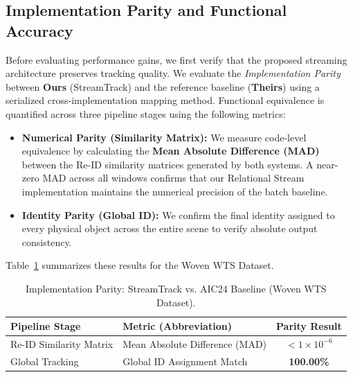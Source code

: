 \documentclass[11pt]{article}
\begin{document}
\subsection{Implementation Parity and Functional Accuracy}
Before evaluating performance gains, we first verify that the proposed streaming architecture preserves tracking quality. We evaluate the \emph{Implementation Parity} between \textbf{Ours} (StreamTrack) and the reference baseline (\textbf{Theirs}) using a serialized cross-implementation mapping method. Functional equivalence is quantified across three pipeline stages using the following metrics:

\begin{itemize}[leftmargin=*]
    \item \textbf{Numerical Parity (Similarity Matrix):} We measure code-level equivalence by calculating the \textbf{Mean Absolute Difference (MAD)} between the Re-ID similarity matrices generated by both systems. A near-zero MAD across all windows confirms that our Relational Stream implementation maintains the numerical precision of the batch baseline.
    \item \textbf{Identity Parity (Global ID):} We confirm the final identity assigned to every physical object across the entire scene to verify absolute output consistency.
\end{itemize}

Table~\ref{tab:parity_metrics} summarizes these results for the Woven WTS Dataset.

\begin{table}[H]
    \centering
    \caption{Implementation Parity: StreamTrack vs. AIC24 Baseline (Woven WTS Dataset).}
    \label{tab:parity_metrics}
    \begin{tabular}{@{}llc@{}}
        \toprule
        \textbf{Pipeline Stage} & \textbf{Metric (Abbreviation)} & \textbf{Parity Result} \\ \midrule
        Re-ID Similarity Matrix & Mean Absolute Difference (MAD) & $< 1 \times 10^{-6}$ \\ \hline
        Global Tracking & Global ID Assignment Match & \textbf{100.00\%} \\ \bottomrule
    \end{tabular}
\end{table}
\end{document}
